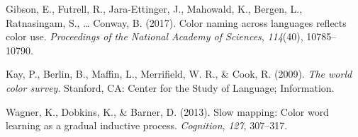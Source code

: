 \documentclass[,man,floatsintext]{apa6}
\theoremstyle{definition}
\theoremstyle{definition}
\theoremstyle{definition}
\theoremstyle{remark}
\begin{document}
\begingroup
\setlength{\parindent}{-0.5in} \setlength{\leftskip}{0.5in}

\hypertarget{refs}{}
\hypertarget{ref-gibson2017}{}
Gibson, E., Futrell, R., Jara-Ettinger, J., Mahowald, K., Bergen, L.,
Ratnasingam, S., \ldots{} Conway, B. (2017). Color naming across
languages reflects color use. \emph{Proceedings of the National Academy
of Sciences}, \emph{114}(40), 10785--10790.

\hypertarget{ref-berlin2009}{}
Kay, P., Berlin, B., Maffin, L., Merrifield, W. R., \& Cook, R. (2009).
\emph{The world color survey}. Stanford, CA: Center for the Study of
Language; Information.

\hypertarget{ref-wagner2013}{}
Wagner, K., Dobkins, K., \& Barner, D. (2013). Slow mapping: Color word
learning as a gradual inductive process. \emph{Cognition}, \emph{127},
307--317.

\endgroup
\end{document}
